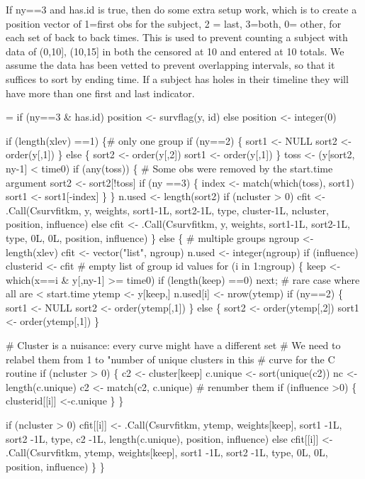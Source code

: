 \documentclass{article}
\begin{document}
If ny==3 and has.id is true, then do some extra setup work, which is to
create a position vector of 1=first obs for the subject, 2 = last, 3=both,
0= other, for each set of back to back times.
This is used to prevent counting a subject with data of (0,10], (10,15] in
both the censored at 10 and entered at 10 totals.
We assume the data has been vetted to prevent overlapping intervals, so that
it suffices to sort by ending time. If a subject has holes in their timeline
they will have more than one first and last indicator.

\begin{nwchunk}
=
 if (ny==3 & has.id) position <- survflag(y, id)
 else position <- integer(0)
 
 if (length(xlev) ==1) \{# only one group
     if (ny==2) \{
         sort1 <- NULL
         sort2 <- order(y[,1]) 
     \}
     else \{
         sort2 <- order(y[,2])
         sort1 <- order(y[,1])
     \}
     toss <- (y[sort2, ny-1] < time0)
     if (any(toss)) \{
         # Some obs were removed by the start.time argument
         sort2 <- sort2[!toss]
         if (ny ==3) \{
             index <- match(which(toss), sort1)
             sort1 <- sort1[-index]
         \}
     \}  
     n.used <- length(sort2)
     if (ncluster > 0)
         cfit <- .Call(Csurvfitkm, y, weights, sort1-1L, sort2-1L, type, 
                                cluster-1L, ncluster, position, influence)
     else cfit <- .Call(Csurvfitkm, y, weights, sort1-1L, sort2-1L, type,
                               0L, 0L, position, influence)
 \} else \{
     # multiple groups
     ngroup <- length(xlev)
     cfit <- vector("list", ngroup)
     n.used <- integer(ngroup)
     if (influence) clusterid <- cfit # empty list of group id values
     for (i in 1:ngroup) \{
         keep <- which(x==i & y[,ny-1] >= time0)
         if (length(keep) ==0) next;  # rare case where all are < start.time
         ytemp <- y[keep,]
         n.used[i] <- nrow(ytemp)
         if (ny==2) \{
             sort1 <- NULL
             sort2 <- order(ytemp[,1]) 
         \}
         else \{
             sort2 <- order(ytemp[,2])
             sort1 <- order(ytemp[,1])
         \}
  
         # Cluster is a nuisance: every curve might have a different set
         #  We need to relabel them from 1 to "number of unique clusters in this
         #  curve for the C routine
         if (ncluster > 0) \{
             c2 <- cluster[keep]
             c.unique <- sort(unique(c2))
             nc <- length(c.unique)
             c2 <- match(c2, c.unique)  # renumber them
             if (influence >0) \{
                 clusterid[[i]] <-c.unique
             \}
         \}
         
         if (ncluster > 0) 
             cfit[[i]] <- .Call(Csurvfitkm, ytemp, weights[keep], sort1 -1L, 
                            sort2 -1L, type,
                            c2 -1L, length(c.unique), position, influence)
         else cfit[[i]] <- .Call(Csurvfitkm, ytemp, weights[keep], sort1 -1L, 
                            sort2 -1L, type,
                            0L, 0L, position, influence)
     \}
 \}
\end{nwchunk}
\end{document}
